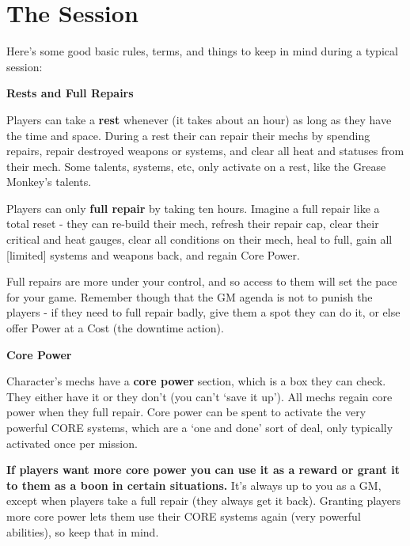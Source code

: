 \section{The Session}

Here’s some good basic rules, terms, and things to keep in mind during a typical session:


\begin{center}
     \textbf{Rests and Full Repairs}
\end{center}

Players can take a \textbf{rest} whenever (it takes about an hour) as long as they have the time and
space. During a rest their can repair their mechs by spending repairs, repair destroyed weapons
or systems, and clear all heat and statuses from their mech. Some talents, systems, etc, only
activate on a rest, like the Grease Monkey’s talents.

Players can only \textbf{full repair} by taking ten hours. Imagine a full repair like a total reset - they can
re-build their mech, refresh their repair cap, clear their critical and heat gauges, clear all
conditions on their mech, heal to full, gain all [limited] systems and weapons back, and regain
Core Power.

Full repairs are more under your control, and so access to them will set the pace for your game.
Remember though that the GM agenda is not to punish the players - if they need to full repair
badly, give them a spot they can do it, or else offer Power at a Cost (the downtime action).

\begin{center}
     \textbf{Core Power}
\end{center}                                               

Character’s mechs have a \textbf{core power} section, which is a box they can check. They either have
it or they don’t (you can’t ‘save it up’). All mechs regain core power when they full repair. Core
power can be spent to activate the very powerful CORE systems, which are a ‘one and done’
sort of deal, only typically activated once per mission.

\textbf{If players want more core power you can use it as a reward or grant it to them as a boon in
certain situations.} It’s always up to you as a GM, except when players take a full repair (they
always get it back). Granting players more core power lets them use their CORE systems again
(very powerful abilities), so keep that in mind.
                                    
